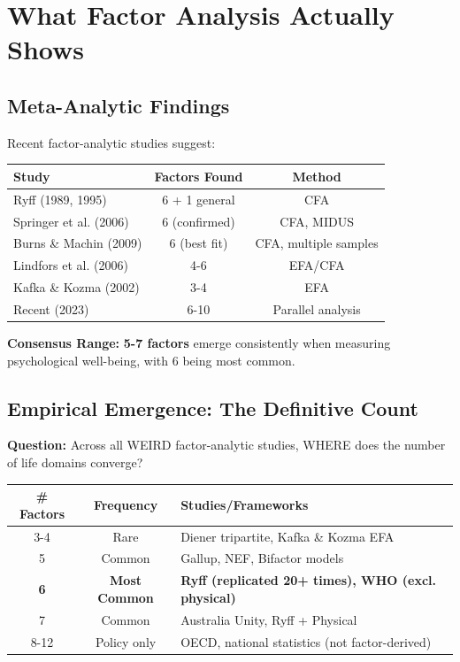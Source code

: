 \section{What Factor Analysis Actually Shows}
\label{sec:bj-factor}

\subsection{Meta-Analytic Findings}

Recent factor-analytic studies suggest:

\begin{center}
\begin{tabular}{@{}lcc@{}}
\toprule
\textbf{Study} & \textbf{Factors Found} & \textbf{Method} \\
\midrule
Ryff (1989, 1995) & 6 + 1 general & CFA \\
Springer et al. (2006) & 6 (confirmed) & CFA, MIDUS \\
Burns \& Machin (2009) & 6 (best fit) & CFA, multiple samples \\
Lindfors et al. (2006) & 4-6 & EFA/CFA \\
Kafka \& Kozma (2002) & 3-4 & EFA \\
Recent (2023) & 6-10 & Parallel analysis \\
\bottomrule
\end{tabular}
\end{center}

\textbf{Consensus Range:} \textbf{5-7 factors} emerge consistently when measuring psychological well-being, with 6 being most common.

\subsection{Empirical Emergence: The Definitive Count}

\textbf{Question:} Across all WEIRD factor-analytic studies, WHERE does the number of life domains converge?

\begin{center}
\begin{tabular}{@{}ccp{6cm}@{}}
\toprule
\textbf{\# Factors} & \textbf{Frequency} & \textbf{Studies/Frameworks} \\
\midrule
3-4 & Rare & Diener tripartite, Kafka \& Kozma EFA \\
5 & Common & Gallup, NEF, Bifactor models \\
\textbf{6} & \textbf{Most Common} & \textbf{Ryff (replicated 20+ times), WHO (excl. physical)} \\
7 & Common & Australia Unity, Ryff + Physical \\
8-12 & Policy only & OECD, national statistics (not factor-derived) \\
\bottomrule
\end{tabular}
\end{center}

